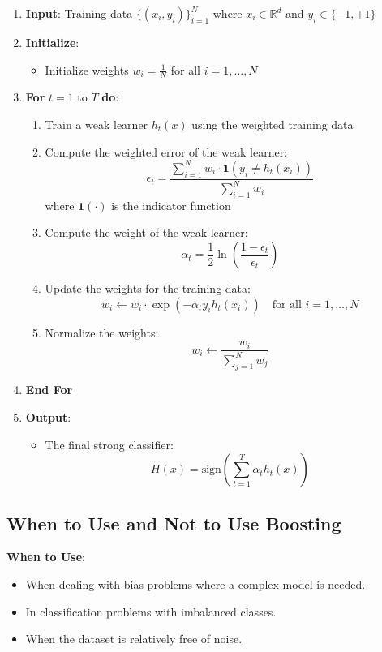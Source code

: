 \documentclass[12pt]{article}
\begin{document}
\begin{enumerate}
    \item \textbf{Input}: Training data $\{(x_i, y_i)\}_{i=1}^N$ where $x_i \in \mathbb{R}^d$ and $y_i \in \{-1, +1\}$
    \item \textbf{Initialize}:
    \begin{itemize}
        \item Initialize weights $w_i = \frac{1}{N}$ for all $i = 1, \ldots, N$
    \end{itemize}
    \item \textbf{For} $t = 1$ to $T$ \textbf{do}:
    \begin{enumerate}
        \item Train a weak learner $h_t(x)$ using the weighted training data
        \item Compute the weighted error of the weak learner:
        \[
        \epsilon_t = \frac{\sum_{i=1}^N w_i \cdot \mathbf{1}(y_i \neq h_t(x_i))}{\sum_{i=1}^N w_i}
        \]
        where $\mathbf{1}(\cdot)$ is the indicator function
        \item Compute the weight of the weak learner:
        \[
        \alpha_t = \frac{1}{2} \ln \left( \frac{1 - \epsilon_t}{\epsilon_t} \right)
        \]
        \item Update the weights for the training data:
        \[
        w_i \leftarrow w_i \cdot \exp(-\alpha_t y_i h_t(x_i)) \quad \text{for all } i = 1, \ldots, N
        \]
        \item Normalize the weights:
        \[
        w_i \leftarrow \frac{w_i}{\sum_{j=1}^N w_j}
        \]
    \end{enumerate}
    \item \textbf{End For}
    \item \textbf{Output}:
    \begin{itemize}
        \item The final strong classifier:
        \[
        H(x) = \text{sign} \left( \sum_{t=1}^T \alpha_t h_t(x) \right)
        \]
    \end{itemize}
\end{enumerate}

\subsection{When to Use and Not to Use Boosting}

\textbf{When to Use}:
\begin{itemize}
    \item When dealing with bias problems where a complex model is needed.
    \item In classification problems with imbalanced classes.
    \item When the dataset is relatively free of noise.
\end{itemize}
\end{document}
